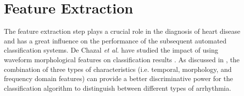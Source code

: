
\section{Feature Extraction}

The feature extraction step plays a crucial role in the diagnosis of heart disease and has a great influence on the performance of the subsequent automated classification systems. De Chazal \textit{et al.} have studied the impact of using waveform morphological features on classification results \cite{autofs}. As discussed in \cite{jambukia2015classification}, the combination of three types of characteristics (i.e. temporal, morphology, and frequency domain features) can provide a better discriminative power for the classification algorithm to distinguish between different types of arrhythmia. 

